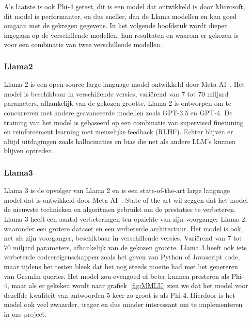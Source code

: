 Als laatste is ook Phi-4 getest, dit is een model dat ontwikkeld is door Microsoft, dit model is performanter, en dus sneller, dan de Llama modellen en kan goed omgaan met de gekregen gegevens.
In het volgende hoofdstuk wordt dieper ingegaan op de verschillende modellen, hun resultaten en waarom er gekozen is voor een combinatie van twee verschillende modellen.

\subsubsection{Llama2}
Llama 2 is een open-source large language model ontwikkeld door Meta AI~\autocite{llama2}. 
Het model is beschikbaar in verschillende versies, variërend van 7 tot 70 miljard parameters, afhankelijk van de gekozen grootte.
Llama 2 is ontworpen om te concurreren met andere geavanceerde modellen zoals GPT-3.5 en GPT-4.
De training van het model is gebaseerd op een combinatie van supervised finetuning en reinforcement learning met menselijke feedback (RLHF).
Echter blijven er altijd uitdagingen zoals hallucinaties en bias die net als andere LLM's kunnen blijven optreden.

\subsubsection{Llama3}
Llama 3 is de opvolger van Llama 2 en is een state-of-the-art large language model dat is ontwikkeld door Meta AI~\autocite{Meta2024}.
State-of-the-art wil zeggen dat het model de nieuwste technieken en algoritmen gebruikt om de prestaties te verbeteren.
Llama 3 heeft een aantal verbeteringen ten opzichte van zijn voorganger Llama 2, waaronder een grotere dataset en een verbeterde architectuur.
Het model is ook, net als zijn voorganger, beschikbaar in verschillende versies. Variërend van 7 tot 70 miljard parameters, afhankelijk van de gekozen grootte.
Llama 3 heeft ook iets verbeterde codeereigenschappen zoals het geven van Python of Javascript code, maar tijdens het testen bleek dat het nog steeds moeite had met het genereren van Gremlin queries.
Het model zou evengoed of beter kunnen presteren als Phi-4, maar als er gekeken wordt naar grafiek~\ref{fig:MMLU} zien we dat het model voor dezelfde kwaliteit van antwoorden 5 keer zo groot is als Phi-4.
Hierdoor is het model ook veel zwaarder, trager en dus minder interessant om te implementeren in ons project.


